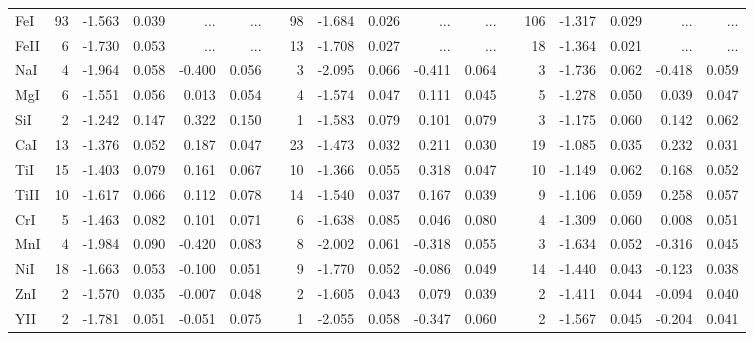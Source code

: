 \documentclass{aa}
\begin{document}
\begin{appendix}
\begin{landscape}
\begin{longtable}{lrrrrrrrrrrrrrrrrr}
FeI  &     93&    -1.563&     0.039&       ...&       ...&&     98&    -1.684&     0.026&       ...&       ...&&    106&    -1.317&     0.029&       ...&       ...\\
FeII &      6&    -1.730&     0.053&       ...&       ...&&     13&    -1.708&     0.027&       ...&       ...&&     18&    -1.364&     0.021&       ...&       ...\\
NaI  &      4&    -1.964&     0.058&    -0.400&     0.056&&      3&    -2.095&     0.066&    -0.411&     0.064&&      3&    -1.736&     0.062&    -0.418&     0.059\\
MgI  &      6&    -1.551&     0.056&     0.013&     0.054&&      4&    -1.574&     0.047&     0.111&     0.045&&      5&    -1.278&     0.050&     0.039&     0.047\\
SiI  &      2&    -1.242&     0.147&     0.322&     0.150&&      1&    -1.583&     0.079&     0.101&     0.079&&      3&    -1.175&     0.060&     0.142&     0.062\\
CaI  &     13&    -1.376&     0.052&     0.187&     0.047&&     23&    -1.473&     0.032&     0.211&     0.030&&     19&    -1.085&     0.035&     0.232&     0.031\\
TiI  &     15&    -1.403&     0.079&     0.161&     0.067&&     10&    -1.366&     0.055&     0.318&     0.047&&     10&    -1.149&     0.062&     0.168&     0.052\\
TiII &     10&    -1.617&     0.066&     0.112&     0.078&&     14&    -1.540&     0.037&     0.167&     0.039&&      9&    -1.106&     0.059&     0.258&     0.057\\
CrI  &      5&    -1.463&     0.082&     0.101&     0.071&&      6&    -1.638&     0.085&     0.046&     0.080&&      4&    -1.309&     0.060&     0.008&     0.051\\
MnI  &      4&    -1.984&     0.090&    -0.420&     0.083&&      8&    -2.002&     0.061&    -0.318&     0.055&&      3&    -1.634&     0.052&    -0.316&     0.045\\
NiI  &     18&    -1.663&     0.053&    -0.100&     0.051&&      9&    -1.770&     0.052&    -0.086&     0.049&&     14&    -1.440&     0.043&    -0.123&     0.038\\
ZnI  &      2&    -1.570&     0.035&    -0.007&     0.048&&      2&    -1.605&     0.043&     0.079&     0.039&&      2&    -1.411&     0.044&    -0.094&     0.040\\
YII  &      2&    -1.781&     0.051&    -0.051&     0.075&&      1&    -2.055&     0.058&    -0.347&     0.060&&      2&    -1.567&     0.045&    -0.204&     0.041\\

\end{longtable}
\end{landscape}
\end{appendix}
\end{document}
